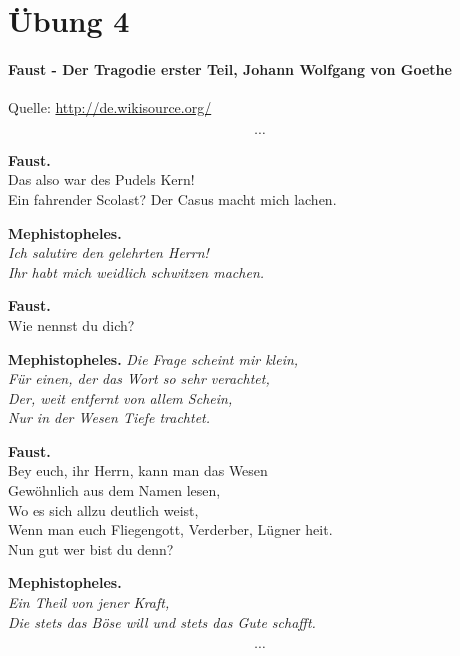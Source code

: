 \documentclass[12pt]{article}
\begin{document}
\section{Übung 4}

\paragraph{Faust - Der Tragodie erster Teil, Johann Wolfgang von Goethe}
Quelle: \url{http://de.wikisource.org/}

\[ \cdots \]

\textbf{Faust.} \\
Das also war des Pudels Kern! \\
Ein fahrender Scolast? Der Casus macht mich lachen. \\

\begin{flushright}
\textbf{Mephistopheles.} \\
\textit{Ich salutire den gelehrten Herrn! \\
Ihr habt mich weidlich schwitzen machen.}
\end{flushright}

\textbf{Faust.} \\
Wie nennst du dich?

\begin{flushright}
\textbf{Mephistopheles.}
\textit{Die Frage scheint mir klein, \\
Für einen, der das Wort so sehr verachtet, \\
Der, weit entfernt von allem Schein, \\
Nur in der Wesen Tiefe trachtet.}
\end{flushright}

\textbf{Faust.} \\
Bey euch, ihr Herrn, kann man das Wesen \\
Gewöhnlich aus dem Namen lesen, \\
Wo es sich allzu deutlich weist, \\
Wenn man euch Fliegengott, Verderber, Lügner heit. \\
Nun gut wer bist du denn?

\begin{flushright}
\textbf{Mephistopheles.} \\
\textit{Ein Theil von jener Kraft, \\
Die stets das Böse will und stets das Gute schafft.}
\end{flushright}

\[ \cdots \]
\end{document}
